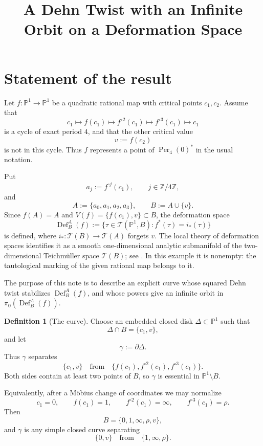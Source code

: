 \documentclass[11pt]{article}
\title{A Dehn Twist with an Infinite Orbit on a Deformation Space}
\date{}
\theoremstyle{definition}
\newtheorem{definition}[theorem]{Definition}
\theoremstyle{remark}
\newcommand{\TT}{\mathcal T}
\newcommand{\Def}{\operatorname{Def}}
\newcommand{\Per}{\operatorname{Per}}
\begin{document}
\maketitle

\section{Statement of the result}

Let \(f:\mathbb P^1\to \mathbb P^1\) be a quadratic rational map with critical
points \(c_1,c_2\).  Assume that
\[
c_1\longmapsto f(c_1)\longmapsto f^{\circ2}(c_1)
 \longmapsto f^{\circ3}(c_1)\longmapsto c_1
\]
is a cycle of exact period \(4\), and that the other critical value
\[
v:=f(c_2)
\]
is not in this cycle.  Thus \(f\) represents a point of
\(\Per_4(0)^*\) in the usual notation.

Put
\[
a_j:=f^{\circ j}(c_1),\qquad j\in\mathbb Z/4\mathbb Z,
\]
and
\[
A:=\{a_0,a_1,a_2,a_3\},\qquad B:=A\cup\{v\}.
\]
Since \(f(A)=A\) and \(V(f)=\{f(c_1),v\}\subset B\), the deformation space
\[
\Def_B^A(f)
 :=\{\tau\in\TT(\mathbb P^1,B):f^*(\tau)=i_*(\tau)\}
\]
is defined, where \(i_*:\TT(B)\to\TT(A)\) forgets \(v\).  The local theory of
deformation spaces identifies it as a smooth one-dimensional analytic
submanifold of the two-dimensional Teichm\"uller space \(\TT(B)\); see
\cite[Theorem~1.2]{KL-arxiv}.  In this example it is nonempty: the tautological
marking of the given rational map belongs to it.

The purpose of this note is to describe an explicit curve whose squared Dehn
twist stabilizes \(\Def_B^A(f)\), and whose powers give an infinite orbit in
\(\pi_0(\Def_B^A(f))\).

\begin{definition}[The curve]
Choose an embedded closed disk \(\Delta\subset\mathbb P^1\) such that
\[
\Delta\cap B=\{c_1,v\},
\]
and let
\[
\gamma:=\partial\Delta.
\]
Thus \(\gamma\) separates
\[
\{c_1,v\}
\quad\text{from}\quad
\{f(c_1),f^{\circ2}(c_1),f^{\circ3}(c_1)\}.
\]
Both sides contain at least two points of \(B\), so \(\gamma\) is essential in
\(\mathbb P^1\setminus B\).
\end{definition}

Equivalently, after a M\"obius change of coordinates we may normalize
\[
c_1=0,\qquad f(c_1)=1,\qquad f^{\circ2}(c_1)=\infty,
\qquad f^{\circ3}(c_1)=\rho.
\]
Then
\[
B=\{0,1,\infty,\rho,v\},
\]
and \(\gamma\) is any simple closed curve separating
\[
\{0,v\}\quad\text{from}\quad\{1,\infty,\rho\}.
\]
\end{document}
